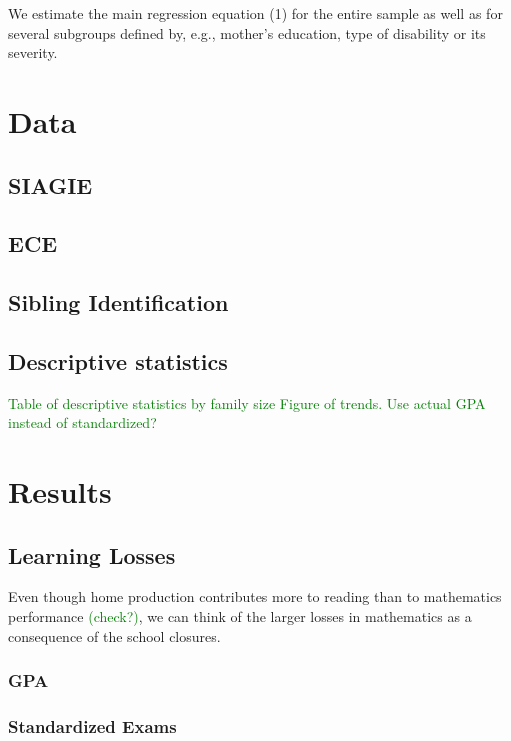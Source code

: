 We estimate the main regression equation (1) for the entire sample as well as for several subgroups defined by, e.g., mother’s education, type of disability or its severity.

\section{Data}\label{sec:data}

\subsection{SIAGIE}

\subsection{ECE}

\subsection{Sibling Identification}

\subsection{Descriptive statistics}

\textcolor{green}{Table of descriptive statistics by family size}
\textcolor{green}{Figure of trends. Use actual GPA instead of standardized?}

\section{Results}\label{sec:results}

\subsection{Learning Losses}

Even though home production contributes more to reading than to mathematics performance \cite{black_recent_2010} \textcolor{green}{(check?)}, we can think of the larger losses in mathematics as a consequence of the school closures.

\subsubsection{GPA}

\subsubsection{Standardized Exams}


